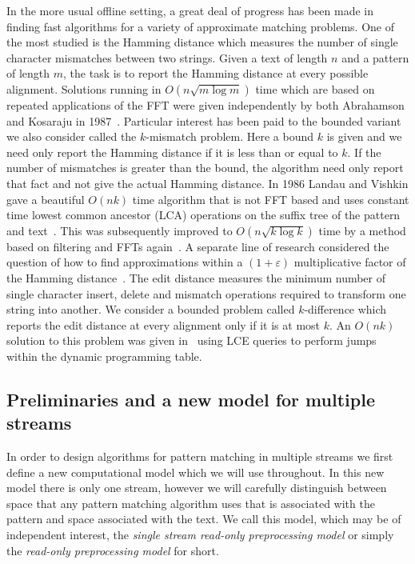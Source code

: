 \documentclass[envcountsame]{llncs}
\renewcommand{\epsilon}{\varepsilon}
\begin{document}
In the more usual offline setting, a great deal of progress has been made in finding fast  algorithms for
a variety of approximate matching problems. One of the most
studied is the Hamming distance which measures the number of
single character mismatches between two strings.  Given a text of length $n$ and a
pattern of length $m$, the task is to report the Hamming distance at
every possible alignment.   Solutions running in $O(n\sqrt{m\log{m}})$ time which are based
on repeated applications of the FFT were given independently by both
Abrahamson and Kosaraju in 1987~\cite{Abrahamson:1987,Kosaraju:1987}.
Particular interest has been paid to the bounded variant we also
consider called the
$k$-mismatch problem.  Here a bound $k$ is given and we need only
report the Hamming distance if it is less than or equal to $k$.  If  the number of mismatches is greater than the bound, the algorithm need only report that fact and not give the actual Hamming distance. In 1986 Landau and Vishkin gave a  beautiful $O(nk)$ time algorithm that is not FFT based and uses constant time
lowest common ancestor (LCA) operations on the suffix tree of the pattern and
text~\cite{LV:1986a}. This was subsequently  improved to $O(n \sqrt{k\log{k}})$ time by a method based on filtering and FFTs again~\cite{ALP:2004}.  A separate line of research considered
the question of how to find approximations within a $(1+\epsilon)$ multiplicative factor of the Hamming distance~\cite{Indyk:1998,Karloff:1993}. The edit distance measures the minimum number of single character insert, delete and mismatch operations required to transform one string into another. We  consider a bounded problem called $k$-difference which reports the edit distance at every alignment only if it is at most $k$. An $O(nk)$ solution to this problem was given in~\cite{LV:1988} using LCE queries to perform jumps within the dynamic programming table.




\subsection{Preliminaries and a new model for multiple streams}

In order to design algorithms for pattern matching in multiple streams
we first define a new computational model which we will use throughout. In this new model there is only one stream, however
we will carefully distinguish between space that any pattern matching
algorithm uses that is associated with the pattern and
space associated with the text.  We call this model, which may be of
independent interest, the \emph{single stream read-only
  preprocessing model} or simply the \emph{read-only preprocessing model} for short.
\end{document}
